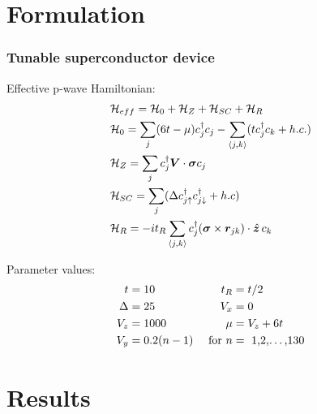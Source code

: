 \documentclass[xcolor=dvipsnames,10pt,aspectratio=169]{beamer}
\newcommand{\ham}{\mathcal{H}}
\newcommand{\FO}{Formulation}
\newcommand{\RE}{Results}
\begin{document}
  \section{\FO}
  \begin{frame}
    \frametitle{Tunable superconductor device}

    \begin{multicols}{2}
      \begin{figure}
        \end{figure}

        \footnotesize
    Effective p-wave Hamiltonian:
    \begin{align}
      &\ham_{eff} = \ham_0 + \ham_Z + \ham_{SC} + \ham_R \notag\\
      &\ham_0 = \sum_j (6t - \mu) c_j^{\dagger} c_j -\sum_{\braket{j,k}} (t c_j^{\dagger} c_k + h.c.) \notag\\
      &\ham_Z = \sum_j c_j^{\dagger} \bm{V} \cdot \bm{\sigma} c_j \notag  \\
      &\ham_{SC} = \sum_j (\Delta c_{j\uparrow}^{\dagger} c_{j\downarrow}^{\dagger} + h.c) \notag \\
      &\ham_R = -it_R\sum_{\braket{j,k}}  c_j^{\dagger} (\bm{\sigma} \times \bm{r}_{jk}) \cdot \hat{\bm{z}} \, c_k \notag
    \end{align}

    Parameter values:
      \begin{align*}
        t &= 10 & t_R &= t/2 \\
        \Delta &= 25 & V_x &= 0 \\
        V_z &= 1000 & \mu &= V_z+6t \\
        V_y &= 0.2(n-1) & \text{ for } n &= \text{ 1,2,\dots,130}
      \end{align*}
      \vspace{-2.00em}
    \end{multicols}

  \end{frame}

  \section{\RE}
\end{document}
